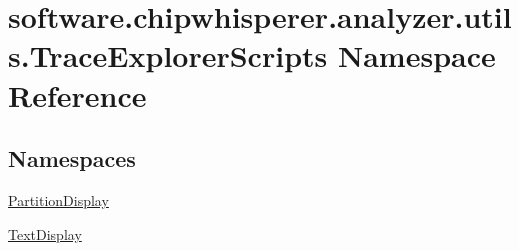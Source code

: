 \hypertarget{namespacesoftware_1_1chipwhisperer_1_1analyzer_1_1utils_1_1TraceExplorerScripts}{}\section{software.\+chipwhisperer.\+analyzer.\+utils.\+Trace\+Explorer\+Scripts Namespace Reference}
\label{namespacesoftware_1_1chipwhisperer_1_1analyzer_1_1utils_1_1TraceExplorerScripts}
\subsection*{Namespaces}
\begin{DoxyCompactItemize}
\item 
 \hyperlink{namespacesoftware_1_1chipwhisperer_1_1analyzer_1_1utils_1_1TraceExplorerScripts_1_1PartitionDisplay}{Partition\+Display}
\item 
 \hyperlink{namespacesoftware_1_1chipwhisperer_1_1analyzer_1_1utils_1_1TraceExplorerScripts_1_1TextDisplay}{Text\+Display}
\end{DoxyCompactItemize}

